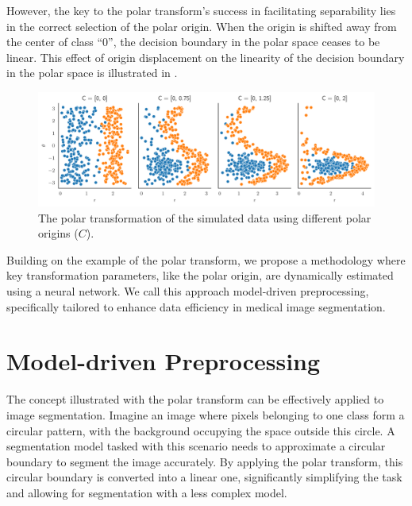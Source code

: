 However, the key to the polar transform's success in facilitating separability lies in the correct selection of the polar origin. When the origin is shifted away from the center of class ``0'', the decision boundary in the polar space ceases to be linear. This effect of origin displacement on the linearity of the decision boundary in the polar space is illustrated in .

 	\begin{figure}[h]
		\centering
		\includegraphics[width=\linewidth]{images/4/data_polar_origin}
		\caption{The polar transformation of the simulated data using different polar origins ($C$).}
		\label{fig:polar-origin-selection}
	\end{figure}
	
	Building on the example of the polar transform, we propose a methodology where key transformation parameters, like the polar origin, are dynamically estimated using a neural network. We call this approach model-driven preprocessing, specifically tailored to enhance data efficiency in medical image segmentation.
	
	
\section{Model-driven Preprocessing}

The concept illustrated with the polar transform can be effectively applied to image segmentation. Imagine an image where pixels belonging to one class form a circular pattern, with the background occupying the space outside this circle. A segmentation model tasked with this scenario needs to approximate a circular boundary to segment the image accurately. By applying the polar transform, this circular boundary is converted into a linear one, significantly simplifying the task and allowing for segmentation with a less complex model.

